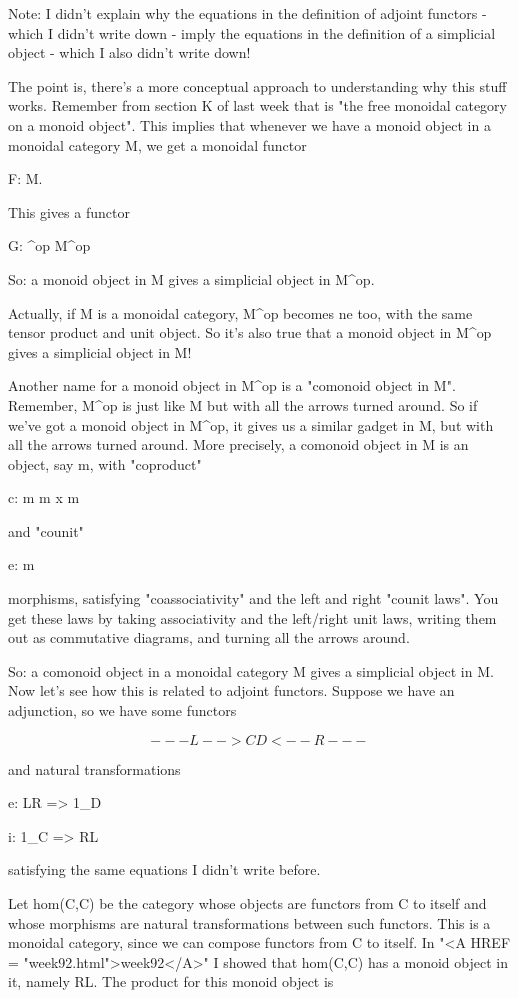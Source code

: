 Note: I didn't explain why the equations in the definition of adjoint
functors - which I didn't write down - imply the equations in the
definition of a simplicial object - which I also didn't write down!

The point is, there's a more conceptual approach to understanding why
this stuff works.  Remember from section K of last week that \Delta  is
"the free monoidal category on a monoid object".  This implies that
whenever we have a monoid object in a monoidal category M, we get a
monoidal functor

F: \Delta  \to  M.

This gives a functor

G: \Delta ^{op} \to  M^{op}

So: a monoid object in M gives a simplicial object in M^{op}.  

Actually, if M is a monoidal category, M^{op} becomes ne too, with the
same tensor product and unit object.  So it's also true that a monoid
object in M^{op} gives a simplicial object in M!

Another name for a monoid object in M^{op} is a "comonoid object in M".
Remember, M^{op} is just like M but with all the arrows turned around.
So if we've got a monoid object in M^{op}, it gives us a similar gadget
in M, but with all the arrows turned around.  More precisely, a comonoid
object in M is an object, say m, with "coproduct"

c: m \to  m x m

and "counit"

e: m 

morphisms, satisfying "coassociativity" and the left and right "counit
laws".  You get these laws by taking associativity and the left/right
unit laws, writing them out as commutative diagrams, and turning all the
arrows around.

So: a comonoid object in a monoidal category M gives a simplicial object
in M.  Now let's see how this is related to adjoint functors.  Suppose
we have an adjunction, so we have some functors


$$

  ---L-->
C         D
  <--R---
$$
    
and natural transformations

e: LR => 1_{D}

i: 1_{C} => RL

satisfying the same equations I didn't write before.  

Let hom(C,C) be the category whose objects are functors from C to
itself and whose morphisms are natural transformations between such
functors.  This is a monoidal category, since we can compose functors
from C to itself.  In "<A HREF = "week92.html">week92</A>" I showed that hom(C,C) has a monoid
object in it, namely RL.  The product for this monoid object is

